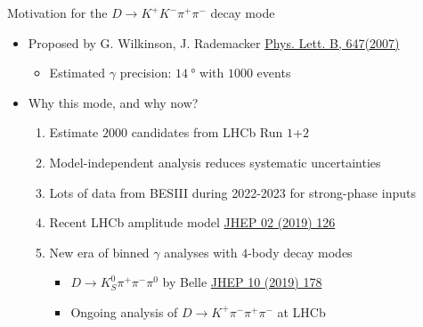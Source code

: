 \documentclass{beamer}
\begin{document}
\begin{frame}{Motivation for the $D\to K^+K^-\pi^+\pi^-$ decay mode}
  \begin{itemize}
    \setlength\itemsep{1.3em}
    \item{Proposed by G. Wilkinson, J. Rademacker \href{https://arxiv.org/abs/hep-ph/0611272}{Phys. Lett. B, 647(2007)}}
    \begin{itemize}
      \item{Estimated $\gamma$ precision: $\SI{14}{\degree}$ with $1000$ events}
    \end{itemize}
    \item{Why this mode, and why now?}
    \begin{enumerate}
      \setlength\itemsep{1.0em}
      \item{Estimate $2000$ candidates from LHCb Run $1$+$2$}
      \item{Model-independent analysis reduces systematic uncertainties}
      \item{Lots of data from BESIII during 2022-2023 for strong-phase inputs}
      \item{Recent LHCb amplitude model \href{https://arxiv.org/abs/1811.08304}{JHEP 02 (2019) 126}}
      \item{New era of binned $\gamma$ analyses with $4$-body decay modes}
      \begin{itemize}
        \item{$D\to K_S^0\pi^+\pi^-\pi^0$ by Belle \href{https://arxiv.org/abs/1908.09499}{JHEP 10 (2019) 178}}
        \item{Ongoing analysis of $D\to K^+\pi^-\pi^+\pi^-$ at LHCb}
      \end{itemize}
    \end{enumerate}
  \end{itemize}
\end{frame}
\end{document}
